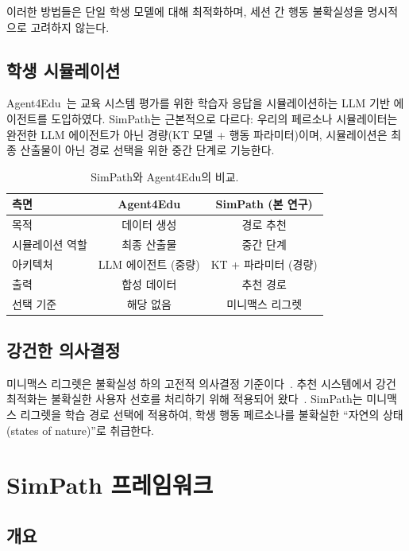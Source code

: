 \documentclass[runningheads]{llncs}
\begin{document}
이러한 방법들은 단일 학생 모델에 대해 최적화하며, 세션 간 행동 불확실성을 명시적으로 고려하지 않는다.

\subsection{학생 시뮬레이션}

Agent4Edu~\cite{agent4edu2025}는 교육 시스템 평가를 위한 학습자 응답을 시뮬레이션하는 LLM 기반 에이전트를 도입하였다.
SimPath는 근본적으로 다르다: 우리의 페르소나 시뮬레이터는 완전한 LLM 에이전트가 아닌 경량(KT 모델 + 행동 파라미터)이며, 시뮬레이션은 최종 산출물이 아닌 경로 선택을 위한 중간 단계로 기능한다.

\begin{table}[t]
\centering
\caption{SimPath와 Agent4Edu의 비교.}
\label{tab:comparison}
\begin{tabular}{lcc}
\toprule
\textbf{측면} & \textbf{Agent4Edu} & \textbf{SimPath (본 연구)} \\
\midrule
목적 & 데이터 생성 & 경로 추천 \\
시뮬레이션 역할 & 최종 산출물 & 중간 단계 \\
아키텍처 & LLM 에이전트 (중량) & KT + 파라미터 (경량) \\
출력 & 합성 데이터 & 추천 경로 \\
선택 기준 & 해당 없음 & 미니맥스 리그렛 \\
\bottomrule
\end{tabular}
\end{table}

\subsection{강건한 의사결정}

미니맥스 리그렛은 불확실성 하의 고전적 의사결정 기준이다~\cite{savage1951}.
추천 시스템에서 강건 최적화는 불확실한 사용자 선호를 처리하기 위해 적용되어 왔다~\cite{robust_rec2020}.
SimPath는 미니맥스 리그렛을 학습 경로 선택에 적용하여, 학생 행동 페르소나를 불확실한 ``자연의 상태(states of nature)''로 취급한다.

\section{SimPath 프레임워크}

\subsection{개요}
\end{document}
